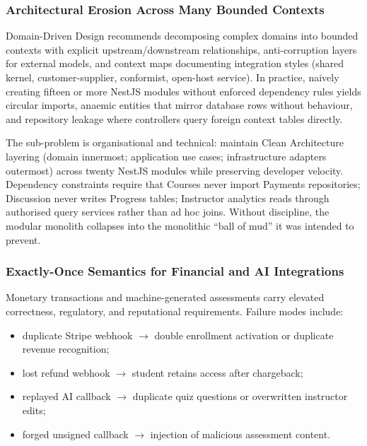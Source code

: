 \subsubsection{Architectural Erosion Across Many Bounded Contexts}
\label{subsubsec:bounded-context-erosion}

Domain-Driven Design recommends decomposing complex domains into bounded contexts with explicit upstream/downstream relationships, anti-corruption layers for external models, and context maps documenting integration styles (shared kernel, customer-supplier, conformist, open-host service). In practice, naively creating fifteen or more NestJS modules without enforced dependency rules yields circular imports, anaemic entities that mirror database rows without behaviour, and repository leakage where controllers query foreign context tables directly.

The sub-problem is organisational and technical: maintain Clean Architecture layering (domain innermost; application use cases; infrastructure adapters outermost) across twenty NestJS modules while preserving developer velocity. Dependency constraints require that Courses never import Payments repositories; Discussion never writes Progress tables; Instructor analytics reads through authorised query services rather than ad hoc joins. Without discipline, the modular monolith collapses into the monolithic ``ball of mud'' it was intended to prevent.

\subsubsection{Exactly-Once Semantics for Financial and AI Integrations}
\label{subsubsec:financial-ai-integrity}

Monetary transactions and machine-generated assessments carry elevated correctness, regulatory, and reputational requirements. Failure modes include:
\begin{itemize}
  \item duplicate Stripe webhook $\rightarrow$ double enrollment activation or duplicate revenue recognition;
  \item lost refund webhook $\rightarrow$ student retains access after chargeback;
  \item replayed AI callback $\rightarrow$ duplicate quiz questions or overwritten instructor edits;
  \item forged unsigned callback $\rightarrow$ injection of malicious assessment content.
\end{itemize}

